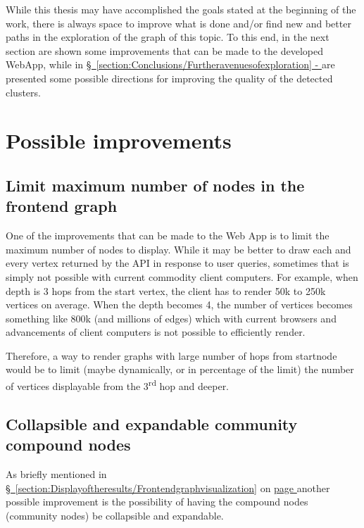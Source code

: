 While this thesis may have accomplished the goals stated at the beginning of the work, there is always space to improve what is done and/or find new and better paths in the exploration of the graph of this topic.
To this end, in the next section are shown some improvements that can be made to the developed \gls{WebApp}, while in \hyperref[section:Conclusions/Furtheravenuesofexploration]{\S\ \ref{section:Conclusions/Furtheravenuesofexploration} - } are presented some possible directions for improving the quality of the detected clusters.

\section{Possible improvements} \label{section:Conclusions/Possibleimprovements}

\subsection{Limit maximum number of nodes in the frontend graph} \label{subsection:Conclusions/Possibleimprovements/Limitmaximumnumberofnodesinthefrontendgraph}
One of the improvements that can be made to the Web App is to limit the maximum number of nodes to display. While it may be better to draw each and every vertex returned by the \acrshort{API} in response to user queries, sometimes that is simply not possible with current commodity client computers. For example, when depth is 3 hops from the start vertex, the client has to render 50k to 250k vertices on average. When the depth becomes 4, the number of vertices becomes something like 800k (and millions of edges) which with current browsers and advancements of client computers is not possible to efficiently render.

Therefore, a way to render graphs with large number of hops from startnode would be to limit (maybe dynamically, or in percentage of the limit) the number of vertices displayable from the 3\textsuperscript{rd} hop and deeper.

\subsection{Collapsible and expandable community compound nodes} \label{subsection:Conclusions/Possibleimprovements/Collapsibleandexpandablecommunitycompoundnodes}
As briefly mentioned in \hyperref[section:Displayoftheresults/Frontendgraphvisualization]{\S\ \ref{section:Displayoftheresults/Frontendgraphvisualization}} on \hyperref[tobementionedinconclusions/Collapsibleandexpandablecommunitycompoundnodes]{page \pageref{tobementionedinconclusions/Collapsibleandexpandablecommunitycompoundnodes}} another possible improvement is the possibility of having the compound nodes (community nodes) be collapsible and expandable.

